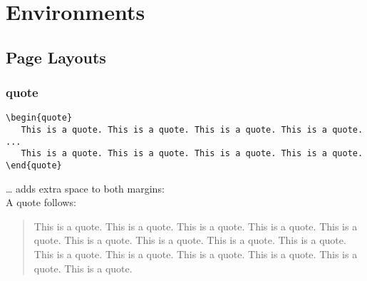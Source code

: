 \documentclass{report}
\begin{document}
\part{Environments}
\chapter{Page Layouts}
\section{quote}
\begin{verbatim}
\begin{quote}
   This is a quote. This is a quote. This is a quote. This is a quote. ...
   This is a quote. This is a quote. This is a quote. This is a quote.
\end{quote}
\end{verbatim}
… adds extra space to both margins:\\
A quote follows:
\begin{quote}
	This is a quote. This is a quote. This is a quote. This is a quote. This is a quote.
	This is a quote. This is a quote. This is a quote. This is a quote. This is a quote.
	This is a quote. This is a quote. This is a quote. This is a quote. This is a quote.
\end{quote}
\end{document}
